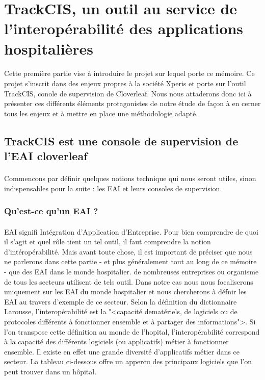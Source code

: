 \section{TrackCIS, un outil au service de l'interopérabilité des applications hospitalières}
	\paragraph{}
	Cette première partie vise à introduire le projet sur lequel porte ce mémoire.
	Ce projet s'inscrit dans des enjeux propres à la société Xperis et porte sur
	l'outil TrackCIS, conole de supervision de Cloverleaf. Nous nous attaderons
	donc ici à présenter ces différents éléments protagonistes de notre étude de
	façon à en cerner tous les enjeux et à mettre en place une méthodologie adapté.

	\subsection{TrackCIS est une console de supervision de l'EAI cloverleaf}
		\paragraph{}
		Commencons par définir quelques notions technique qui nous seront utiles,
		sinon indispensables pour la suite : les EAI et leurs consoles de supervision.
		
		\subsubsection{Qu'est-ce qu'un EAI ?}
			\paragraph{}%
			EAI signifi Intégration d'Application d'Entreprise. Pour bien comprendre de
			quoi il s'agit et quel rôle tient un tel outil, il faut comprendre la notion
			d'intéropérabilité. Mais avant toute chose, il est important de préciser que
			nous ne parlerons dans cette partie - et plus généralement tout au long de ce
			mémoire - que des EAI dans le monde hospitalier. de nombreuses entreprises ou
			organisme de tous les secteurs utilisent de tels outil. Dans notre cas nous nous
			focaliserons uniquement sur les EAI du monde hospitalier et nous
			chercherons à défnir les EAI au travers d'exemple de ce secteur.\newline
			Selon la définition du dictionnaire Larousse, l'interopérabilité est la "<capacité dematériels, de logiciels ou de protocoles différents à
			fonctionner ensemble et à partager des informations">. Si l'on transpose
			cette définition au monde de l'hopital, l'interopérabilité correspond à la
			capacité des différents logiciels (ou applicatifs) métier à fonctionner
			ensemble. Il existe en effet une grande diversité d'applicatifs métier dans
			ce secteur. La tableau ci-dessous offre un appercu des principaux logiciels
			que l'on peut trouver dans un hôpital.\newline
			

